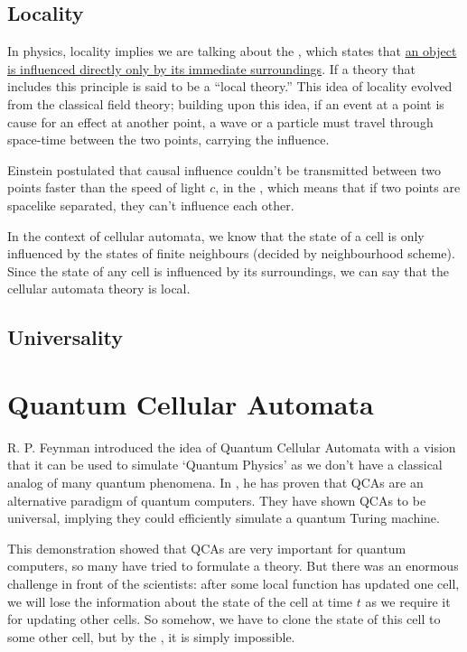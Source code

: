 \documentclass[11pt, oneside]{scrbook}
\begin{document}
\subsection{Locality} \label{ssec: locality}

In physics, locality implies we are talking about the , which states that \uline{an object is influenced directly only by its immediate surroundings}. If a theory that includes this principle is said to be a ``local theory.'' This idea of locality evolved from the classical field theory; building upon this idea, if an event at a point is cause for an effect at another point, a wave or a particle must travel through space-time between the two points, carrying the influence.

Einstein postulated that causal influence couldn't be transmitted between two points faster than the speed of light \(c\), in the , which means that if two points are spacelike separated, they can't influence each other. %

In the context of cellular automata, we know that the state of a cell is only influenced by the states of finite neighbours (decided by neighbourhood scheme). Since the state of any cell is influenced by its surroundings, we can say that the cellular automata theory is local.
\subsection{Universality} \label{ssec: universality}

\section{Quantum Cellular Automata}
R. P. Feynman introduced the idea of Quantum Cellular Automata with a vision that it can be used to simulate `Quantum Physics' as we don't have a classical analog of many quantum phenomena. In \cite{Watrous1995}, he has proven that QCAs are an alternative paradigm of quantum computers. They have shown QCAs to be universal, implying they could efficiently simulate a quantum Turing machine.

This demonstration showed that QCAs are very important for quantum computers, so many have tried to formulate a theory. But there was an enormous challenge in front of the scientists: after some local function has updated one cell, we will lose the information about the state of the cell at time \(t\) as we require it for updating other cells. So somehow, we have to clone the state of this cell to some other cell, but by the , it is simply impossible.
\end{document}
